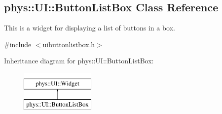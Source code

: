 \hypertarget{classphys_1_1UI_1_1ButtonListBox}{
\subsection{phys::UI::ButtonListBox Class Reference}
\label{classphys_1_1UI_1_1ButtonListBox}
}


This is a widget for displaying a list of buttons in a box.  




{\ttfamily \#include $<$uibuttonlistbox.h$>$}

Inheritance diagram for phys::UI::ButtonListBox:\begin{figure}[H]
\begin{center}
\leavevmode
\includegraphics[height=2.000000cm]{classphys_1_1UI_1_1ButtonListBox}
\end{center}
\end{figure}
